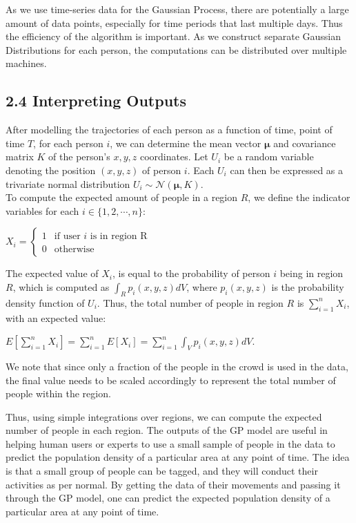 \documentclass[letterpaper]{article}
\begin{document}
As we use time-series data for the Gaussian Process, there are potentially a large amount of data points, especially for time periods that last multiple days. Thus the efficiency of the algorithm is important. As we construct separate Gaussian Distributions for each person, the computations can be distributed over multiple machines.

\subsection{2.4  Interpreting Outputs}

After modelling the trajectories of each person as a function of time, point of time $T$, for each person $i$, we can determine the mean vector $\boldsymbol{\mu}$ and covariance matrix $K$ of the person's $x,y,z$ coordinates. Let $U_i$ be a random variable denoting the position $(x,y,z)$ of person $i$. Each $U_i$ can then be expressed as a trivariate normal distribution $U_i \sim \mathcal{N}(\boldsymbol{\mu},K)$.\\

To compute the expected amount of people in a region $R$, we define the indicator variables for each $i \in \{1,2,\cdots,n\}$:
\begin{center}
$X_i =
\begin{cases}
    1 &\text{if user }i\text{ is in region R}\\
    0 &\text{otherwise}
\end{cases}$
\end{center}
The expected value of $X_i$, is equal to the probability of person $i$ being in region $R$, which is computed as $\int_R p_i(x,y,z)dV$, where $p_i(x,y,z)$ is the probability density function of $U_i$. Thus, the total number of people in region $R$ is $\sum_{i=1}^n X_i$, with an expected value:
\begin{center}
$\displaystyle E[\sum_{i=1}^n X_i] = \sum_{i=1}^n E[X_i] = \sum_{i=1}^n \int_V p_i(x,y,z)dV$.
\end{center}

We note that since only a fraction of the people in the crowd is used in the data, the final value needs to be scaled accordingly to represent the total number of people within the region.

Thus, using simple integrations over regions, we can compute the expected number of people in each region. The outputs of the GP model are useful in helping human users or experts to use a small sample of people in the data to predict the population density of a particular area at any point of time. The idea is that a small group of people can be tagged, and they will conduct their activities as per normal. By getting the data of their movements and passing it through the GP model, one can predict the expected population density of a particular area at any point of time.
\end{document}
